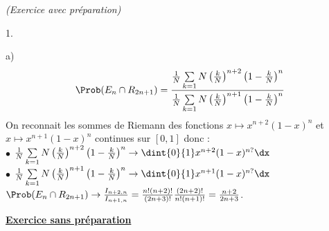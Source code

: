 \documentclass[11pt]{article}%
\begin{document}
\begin{exercice}{\it (Exercice avec préparation)}
\begin{noliste}{1.}
\begin{noliste}{a)}
\[
 \Prob(E_{n} \cap R_{2n + 1}) = \frac{\frac{1}{N}\sum \limits_{k =
1}{N}
 \left( \frac{k}{N}\right)^{n + 2} \left(1-\frac{k}{N} \right)^{n}
 }{\frac{1}{N}\sum \limits_{k = 1}{N} \left(
 \frac{k}{N}\right)^{n + 1} \left(1-\frac{k}{N} \right)^{n}}
\]
On reconnait les sommes de Riemann des fonctions $x \mapsto x^{n + 2}
(1-x)^{n}$ et $x \mapsto x^{n + 1}(1-x)^{n} $ continues sur
$[0,1]$ donc : \\
$\bullet$ $\frac{1}{N}\sum \limits_{k = 1}{N} \left(
  \frac{k}{N}\right)^{n + 2} \left(1-\frac{k}{N} \right)^{n} \to
\dint{0}{1} x^{n + 2} (1-x)^{n?} \dx$\\
$\bullet$ $\frac{1}{N}\sum \limits_{k = 1}{N} \left(
  \frac{k}{N}\right)^{n + 1} \left(1-\frac{k}{N} \right)^{n} \to
\dint{0}{1} x^{n + 1} (1-x)^{n?} \dx$\\
$\Prob(E_{n} \cap R_{2n + 1}) \to \frac{I_{n + 2,n}}{I_{n + 1,n}} =
\frac{n!(n + 2)!}{(2n + 3)!} \frac{(2n + 2)!}{n!(n + 1)!} = \frac{n +
  2}{2n + 3}$.
 \end{noliste}
 \item
 \end{noliste}
 \textbf{\underline{Exercice sans préparation}} \\
\\
\end{exercice}
\end{document}
